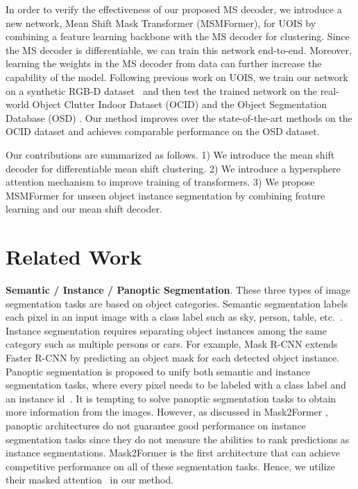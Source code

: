\documentclass[letterpaper, 10 pt, conference]{ieeeconf}
\begin{document}
In order to verify the effectiveness of our proposed MS decoder, we introduce a new network, Mean Shift Mask Transformer (MSMFormer), for UOIS by combining a feature learning backbone with the MS decoder for clustering. Since the MS decoder is differentiable, we can train this network end-to-end. Moreover, learning the weights in the MS decoder from data can further increase the capability of the model. Following previous work on UOIS, we train our network on a synthetic RGB-D dataset~\cite{xie2020best} and then test the trained network on the real-world Object Clutter Indoor Dataset (OCID) \cite{suchi2019easylabel} and the Object Segmentation Database (OSD) \cite{richtsfeld2012segmentation}. Our method improves over the state-of-the-art methods on the OCID dataset and achieves comparable performance on the OSD dataset.

Our contributions are summarized as follows. 1) We introduce the mean shift decoder for differentiable mean shift clustering. 2) We introduce a hypersphere attention mechanism to improve training of transformers. 3) We propose MSMFormer for unseen object instance segmentation by combining feature learning and our mean shift decoder.


\section{Related Work}
\vspace{-1mm}

\textbf{Semantic / Instance / Panoptic Segmentation}. These three types of image segmentation tasks are based on object categories. Semantic segmentation labels each pixel in an input image with a class label such as sky, person, table, etc.~\cite{long2015fully,chen2017deeplab}. Instance segmentation requires separating object instances among the same category such as multiple persons or cars. For example, Mask R-CNN \cite{he2017mask} extends Faster R-CNN \cite{Ren2015} by predicting an object mask for each detected object instance. Panoptic segmentation is proposed to unify both semantic and instance segmentation tasks, where every pixel needs to be labeled with a class label and an instance id~\cite{kirillov2019panoptic,cheng2020panoptic,li2022fully}. It is tempting to solve panoptic segmentation tasks to obtain more information from the images. However, as discussed in Mask2Former \cite{cheng2022masked}, panoptic architectures do not guarantee good
performance on instance segmentation tasks since they do not measure the abilities to
rank predictions as instance segmentations. Mask2Former \cite{cheng2022masked} is the first architecture that can achieve competitive performance on all of these segmentation tasks. Hence, we utilize their masked attention~\cite{cheng2022masked} in our method.
\end{document}
